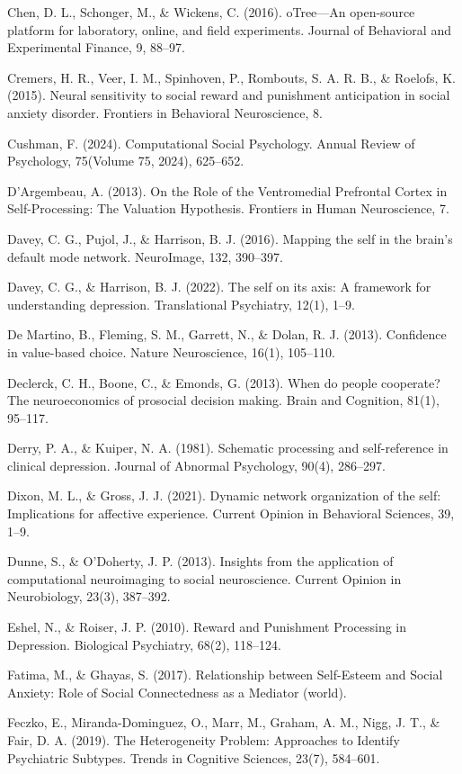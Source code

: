 \documentclass[12pt,a4paper,oneside,]{book} %
\begin{document}
Chen, D. L., Schonger, M., \& Wickens, C. (2016). oTree---An open-source platform for laboratory, online, and field experiments. Journal of Behavioral and Experimental Finance, 9, 88--97.

Cremers, H. R., Veer, I. M., Spinhoven, P., Rombouts, S. A. R. B., \& Roelofs, K. (2015). Neural sensitivity to social reward and punishment anticipation in social anxiety disorder. Frontiers in Behavioral Neuroscience, 8.

Cushman, F. (2024). Computational Social Psychology. Annual Review of Psychology, 75(Volume 75, 2024), 625--652.

D'Argembeau, A. (2013). On the Role of the Ventromedial Prefrontal Cortex in Self-Processing: The Valuation Hypothesis. Frontiers in Human Neuroscience, 7.

Davey, C. G., Pujol, J., \& Harrison, B. J. (2016). Mapping the self in the brain's default mode network. NeuroImage, 132, 390--397.

Davey, C. G., \& Harrison, B. J. (2022). The self on its axis: A framework for understanding depression. Translational Psychiatry, 12(1), 1--9.

De Martino, B., Fleming, S. M., Garrett, N., \& Dolan, R. J. (2013). Confidence in value-based choice. Nature Neuroscience, 16(1), 105--110.

Declerck, C. H., Boone, C., \& Emonds, G. (2013). When do people cooperate? The neuroeconomics of prosocial decision making. Brain and Cognition, 81(1), 95--117.

Derry, P. A., \& Kuiper, N. A. (1981). Schematic processing and self-reference in clinical depression. Journal of Abnormal Psychology, 90(4), 286--297.

Dixon, M. L., \& Gross, J. J. (2021). Dynamic network organization of the self: Implications for affective experience. Current Opinion in Behavioral Sciences, 39, 1--9.

Dunne, S., \& O'Doherty, J. P. (2013). Insights from the application of computational neuroimaging to social neuroscience. Current Opinion in Neurobiology, 23(3), 387--392.

Eshel, N., \& Roiser, J. P. (2010). Reward and Punishment Processing in Depression. Biological Psychiatry, 68(2), 118--124.

Fatima, M., \& Ghayas, S. (2017). Relationship between Self-Esteem and Social Anxiety: Role of Social Connectedness as a Mediator (world).

Feczko, E., Miranda-Dominguez, O., Marr, M., Graham, A. M., Nigg, J. T., \& Fair, D. A. (2019). The Heterogeneity Problem: Approaches to Identify Psychiatric Subtypes. Trends in Cognitive Sciences, 23(7), 584--601.
\end{document}
